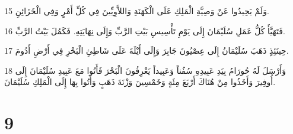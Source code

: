 \par 15 وَلَمْ يَحِيدُوا عَنْ وَصِيَّةِ الْمَلِكِ عَلَى الْكَهَنَةِ وَاللاَّوِيِّينَ فِي كُلِّ أَمْرٍ وَفِي الْخَزَائِنِ.
\par 16 فَتَهَيَّأَ كُلُّ عَمَلِ سُلَيْمَانَ إِلَى يَوْمِ تَأْسِيسِ بَيْتِ الرَّبِّ وَإِلَى نِهَايَتِهِ. فَكَمُلَ بَيْتُ الرَّبِّ.
\par 17 حِينَئِذٍ ذَهَبَ سُلَيْمَانُ إِلَى عِصْيُونَ جَابِرَ وَإِلَى أَيْلَةَ عَلَى شَاطِئِ الْبَحْرِ فِي أَرْضِ أَدُومَ.
\par 18 وَأَرْسَلَ لَهُ حُورَامُ بِيَدِ عَبِيدِهِ سُفُناً وَعَبِيداً يَعْرِفُونَ الْبَحْرَ فَأَتُوا مَعَ عَبِيدِ سُلَيْمَانَ إِلَى أُوفِيرَ وَأَخَذُوا مِنْ هُنَاكَ أَرْبَعَ مِئَةٍ وَخَمْسِينَ وَزْنَةَ ذَهَبٍ وَأَتُوا بِهَا إِلَى الْمَلِكِ سُلَيْمَانَ.

\chapter{9}

